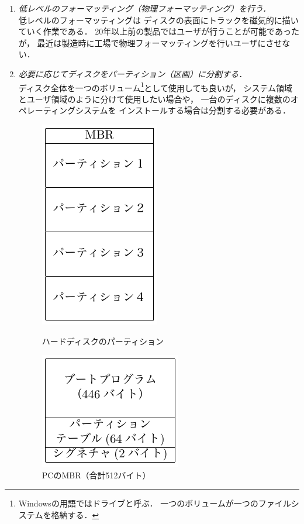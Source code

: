 \begin{enumerate}
\item \emph{低レベルのフォーマッティング（物理フォーマッティング）を行う．}\\
  低レベルのフォーマッティングは
  ディスクの表面にトラックを磁気的に描いていく作業である．
  20年以上前の製品ではユーザが行うことが可能であったが，
  最近は製造時に工場で物理フォーマッティングを行いユーザにさせない．
\item \emph{必要に応じてディスクをパーティション（区画）に分割する．}\\
  ディスク全体を一つのボリューム\footnote{
    Windowsの用語ではドライブと呼ぶ．
    一つのボリュームが一つのファイルシステムを格納する．
  }として使用しても良いが，
  システム領域とユーザ領域のように分けて使用したい場合や，
  一台のディスクに複数のオペレーティングシステムを
  インストールする場合は分割する必要がある．

  \begin{figure}[btp]
    \begin{center}
      \begin{minipage}{0.49\columnwidth}
        \centerline{\includegraphics[scale=1.0]{Fig/hddPartition.pdf}}
        \caption{ハードディスクのパーティション}\label{fig:hddPartition}
      \end{minipage}
      \begin{minipage}{0.49\columnwidth}
        \centerline{\includegraphics[scale=1.0]{Fig/masterBootRecord.pdf}}
        \caption{PCのMBR（合計512バイト）}\label{fig:masterBootRecord}
      \end{minipage}
    \end{center}
  \end{figure}


\end{enumerate}
